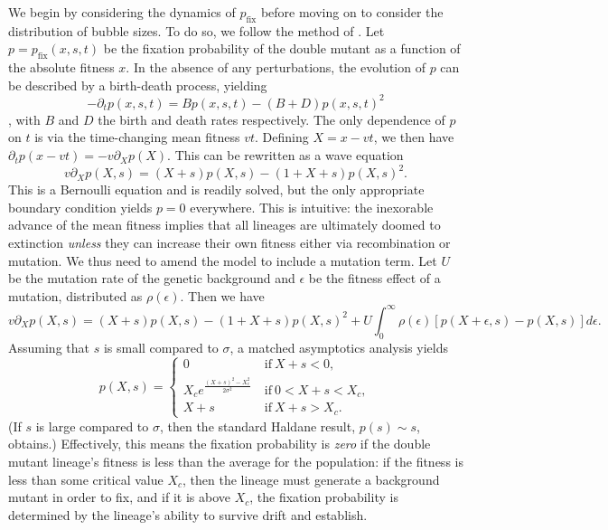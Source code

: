 \documentclass[rmp]{revtex4}
\begin{document}
We begin by considering the dynamics of $p_{\mathrm {fix}}$ before moving on to consider the distribution of bubble sizes.
To do so, we follow the method of \citet{good_2012}.
Let $p = p_{\mathrm{fix}}(x,s,t)$ be the fixation probability of the double mutant as a function of the absolute fitness $x$.
In the absence of any perturbations, the evolution of $p$ can be described by a birth-death process, yielding
\begin{equation}
-\partial_t p(x,s,t) = Bp(x,s,t) - (B+D)p(x,s,t)^2
\end{equation}
\citep{barton_1995}, with $B$ and $D$ the birth and death rates respectively.
The only dependence of $p$ on $t$ is via the time-changing mean fitness $vt$.
Defining $X = x - vt$, we then have $\partial_t p(x-vt) = -v\partial_X p(X)$.
This can be rewritten as a wave equation
\begin{equation}
v \partial_X p(X,s) = (X+s)p(X,s) - (1+X+s)p(X,s)^2.
\end{equation}
This is a Bernoulli equation and is readily solved, but the only appropriate boundary condition yields $p = 0$ everywhere.
This is intuitive: the inexorable advance of the mean fitness implies that all lineages are ultimately doomed to extinction \emph{unless} they can increase their own fitness either via recombination or mutation.
We thus need to amend the model to include a mutation term.
Let $U$ be the mutation rate of the genetic background and $\epsilon$ be the fitness effect of a mutation, distributed as $\rho(\epsilon)$.
Then we have
\begin{equation}
v \partial_X p(X,s) = (X+s)p(X,s) - (1+X+s)p(X,s)^2 + U\int_0^\infty \rho(\epsilon) \left[ p(X+\epsilon,s)-p(X,s)\right] d\epsilon.
\end{equation}
Assuming that $s$ is small compared to $\sigma$, a matched asymptotics analysis yields
\begin{equation}
p(X,s) =
\begin{cases}
0 &\mathrm{~if~} X+s < 0, \\
X_c e^{\frac{(X+s)^2-X_c^2}{2\sigma^2}} &\mathrm{~if~} 0 < X+s < X_c, \\
X+s &\mathrm{~if~} X+s > X_c.
\end{cases}
\end{equation}
(If $s$ is large compared to $\sigma$, then the standard Haldane result, $p(s) \sim s$, obtains.)
Effectively, this means the fixation probability is \emph{zero} if the double mutant lineage's fitness is less than the average for the population: if the fitness is less than some critical value $X_c$, then the lineage must generate a background mutant in order to fix, and if it is above $X_c$, the fixation probability is determined by the lineage's ability to survive drift and establish.
\end{document}
